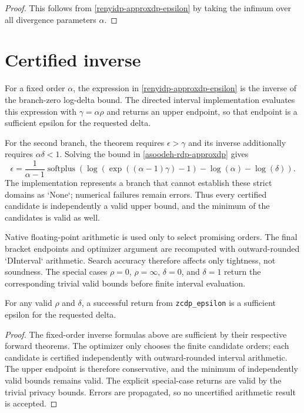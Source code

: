\documentclass{article}
\begin{document}
\begin{proof}
This follows from \ref{renyidp-approxdp-epsilon} by taking the infimum over all divergence parameters $\alpha$.
\end{proof}

\section{Certified inverse}

For a fixed order $\alpha$, the expression in
\ref{renyidp-approxdp-epsilon} is the inverse of the branch-zero
log-delta bound. The directed interval implementation evaluates this
expression with $\gamma = \alpha\rho$ and returns an upper endpoint, so
that endpoint is a sufficient epsilon for the requested delta.

For the second branch, the theorem requires $\epsilon > \gamma$ and its
inverse additionally requires $\alpha\delta < 1$. Solving the bound in
\ref{asoodeh-rdp-approxdp} gives
\begin{equation}
    \epsilon = \frac{1}{\alpha-1}
    \operatorname{softplus}\left(\log(\exp((\alpha-1)\gamma)-1)
    -\log(\alpha)-\log(\delta)\right).
\end{equation}
The implementation represents a branch that cannot establish these strict
domains as `None`; numerical failures remain errors. Thus every certified
candidate is independently a valid upper bound, and the minimum of the
candidates is valid as well.

Native floating-point arithmetic is used only to select promising orders.
The final bracket endpoints and optimizer argument are recomputed with
outward-rounded `DInterval` arithmetic. Search accuracy therefore affects
only tightness, not soundness. The special cases $\rho=0$, $\rho=\infty$,
$\delta=0$, and $\delta=1$ return the corresponding trivial valid bounds
before finite interval evaluation.

\begin{theorem}
For any valid $\rho$ and $\delta$, a successful return from
\texttt{zcdp\_epsilon} is a sufficient epsilon for the requested delta.
\end{theorem}
\begin{proof}
The fixed-order inverse formulas above are sufficient by their respective
forward theorems. The optimizer only chooses the finite candidate orders;
each candidate is certified independently with outward-rounded interval
arithmetic. The upper endpoint is therefore conservative, and the minimum
of independently valid bounds remains valid. The explicit special-case
returns are valid by the trivial privacy bounds. Errors are propagated, so
no uncertified arithmetic result is accepted.
\end{proof}
\end{document}
